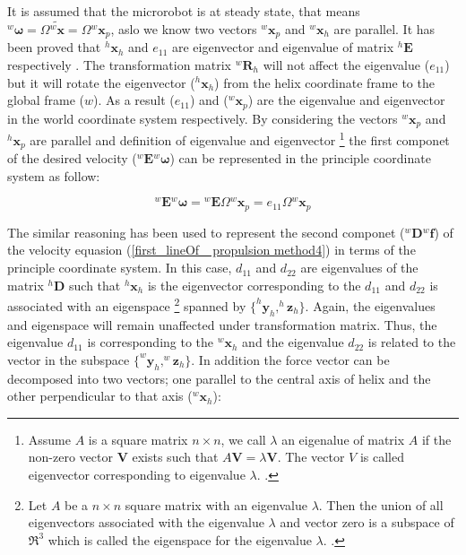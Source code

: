 \documentclass[12pt,a4paper,titlepage]{report}
\begin{document}
It is assumed that the microrobot is at steady state, that means $^{w}\bm{\omega} = 
\Omega \tilde{^{w}{\bm{x}}} = \Omega {^{w}{\bm{x}_p}}$, aslo we know two vectors ${^{w}{\bm{x}_p}}$ and
 ${^{w}{\bm{x}_h}}$ are parallel. It has been proved that $^{h}\bm{x}_h$ and $e_{11}$ are eigenvector and eigenvalue
of matrix $^{h}\bm{E}$ respectively \citep{mahoney2011velocity}. The transformation matrix $^{w}\bm{R}_h$ 
will not affect the eigenvalue ($e_{11}$) but it will rotate the eigenvector ($^{h}\bm{x}_h$) from the helix coordinate
frame to the global frame ($w$). As a result ($e_{11}$) and ($^{w}\bm{x}_p$) are the eigenvalue and eigenvector
in the world coordinate system respectively. By considering the vectors $^{w}\bm{x}_p$ and $^{h}\bm{x}_p$ are parallel 
and definition of eigenvalue and eigenvector \footnote{Assume $A $ is a square matrix $n \times n$, we call
$\lambda$ an eigenalue of matrix $A$ if the non-zero vector $\bm{V}$ exists such that $A\bm{V} = \lambda \bm{V}$.
The vector $V$ is called eigenvector corresponding to eigenvalue $\lambda$.
 \citep{Doe:2013Nov:Online}.}
the first componet of the desired velocity (${^{w}\bm{E}} {^{w}\bm{\omega}}$) can be 
represented in the principle
coordinate system as follow:


\begin{equation}
{^{w}\bm{E}} {^{w}\bm{\omega}} = {^{w}\bm{E}} \Omega {^{w}{\bm{x}_p}} = e_{11} \Omega {^{w}{\bm{x}_p}}
\label{E_W}
\end{equation}

The similar reasoning has been used to represent the second componet (${^{w}\bm{D}} {^{w}\bm{f}}$) of 
the velocity equasion (\ref{first_lineOf_ propulsion method4}) in terms of the
principle coordinate system. In this case, $d_{11}$ and $d_{22}$ are eigenvalues of the matrix $^{h}\bm{D}$ 
such that $^{h}\bm{x}_h$ is the eigenvector corresponding to the $d_{11}$ and $d_{22}$ is associated with
an eigenspace \footnote{Let $A $ be a $n \times n$ square matrix with an 
eigenvalue $\lambda$. Then the union of all eigenvectors associated with the eigenvalue $\lambda $ and
vector zero is a subspace of $\Re ^{3}$ which is called the eigenspace for the eigenvalue $\lambda$.
\citep{Doe:2014Aug:Online}.} spanned by $\{ ^{h}\bm{y}_{h} , ^{h}\bm{z}_{h} \}$. Again, the eigenvalues and
eigenspace will remain unaffected under transformation matrix. Thus, the eigenvalue $d_{11}$ is corresponding 
to the $^{w}\bm{x}_h$ and the eigenvalue $d_{22}$ is related to the vector in the 
subspace $\{ ^{w}\bm{y}_h ,   ^{w}\bm{z}_h  \}$. In addition the force vector can be decomposed into two  
vectors; one parallel to the central axis of helix and the other perpendicular to that axis ($^{w}\bm{x}_h$):
\end{document}

